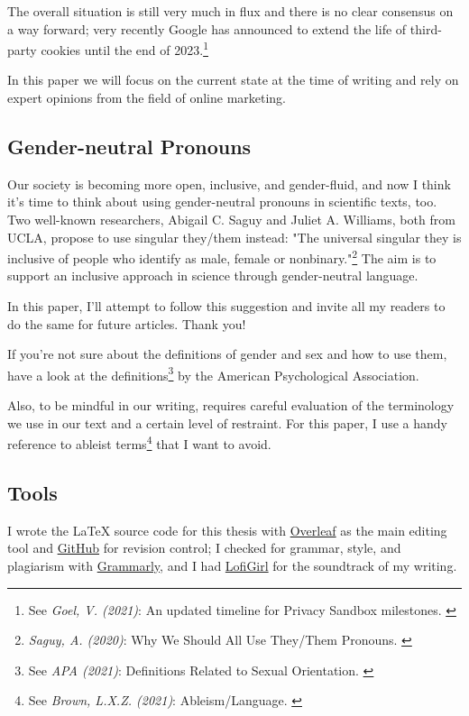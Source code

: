 The overall situation is still very much in flux and there is no clear consensus on a way forward; very recently Google has announced to extend the life of third-party cookies until the end of 2023.\footnote{See \textit{Goel, V. (2021)}: An updated timeline for Privacy Sandbox milestones. \cite{sandboxDelay}}

In this paper we will focus on the current state at the time of writing and rely on expert opinions from the field of online marketing.

\subsection{Gender-neutral Pronouns}

Our society is becoming more open, inclusive, and gender-fluid, and now I think it's time to think about using gender-neutral pronouns in scientific texts, too. Two well-known researchers, Abigail C. Saguy and Juliet A. Williams, both from UCLA, propose to use singular they/them instead: "The universal singular they is inclusive of people who identify as male, female or nonbinary."\footnote{\textit{Saguy, A. (2020)}: Why We Should All Use They/Them Pronouns. \cite{pronouns}} The aim is to support an inclusive approach in science through gender-neutral language. 

In this paper, I'll attempt to follow this suggestion and invite all my readers to do the same for future articles. Thank you!

If you're not sure about the definitions of gender and sex and how to use them, have a look at the definitions\footnote{See \textit{APA (2021)}: Definitions Related to Sexual Orientation. \cite{apaDefinitions}} by the American Psychological Association.

Also, to be mindful in our writing, requires careful evaluation of the terminology we use in our text and a certain level of restraint. For this paper, I use a handy reference to ableist terms\footnote{See \textit{Brown, L.X.Z. (2021)}: Ableism/Language. \cite{ableismLanguage}} that I want to avoid.

\subsection{Tools}

I wrote the LaTeX source code for this thesis with \href{https://www.overleaf.com/}{Overleaf} as the main editing tool and \href{https://github.com/chfrank-cgn/Bachelor-Arbeit}{GitHub} for revision control; I checked for grammar, style, and plagiarism with \href{https://app.grammarly.com/}{Grammarly}, and I had \href{https://www.youtube.com/watch?v=5qap5aO4i9A}{LofiGirl} for the soundtrack of my writing.


